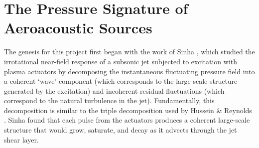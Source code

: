 \chapter{The Pressure Signature of Aeroacoustic Sources}
\label{sect:nearfield}
The genesis for this project first began with the work of Sinha \etal \citep{Sinha2012}, which studied the irrotational near-field response of a subsonic jet subjected to excitation with plasma actuators by decomposing the instantaneous fluctuating pressure field into a coherent `wave' component (which corresponds to the large-scale structure generated by the excitation) and incoherent residual fluctuations (which correspond to the natural turbulence in the jet). 
Fundamentally, this decomposition is similar to the triple decomposition used by Hussein \& Reynolds \citep{Hussain1970}.
Sinha \etal found that each pulse from the actuators produces a coherent large-scale structure that would grow, saturate, and decay as it advects through the jet shear layer. 

